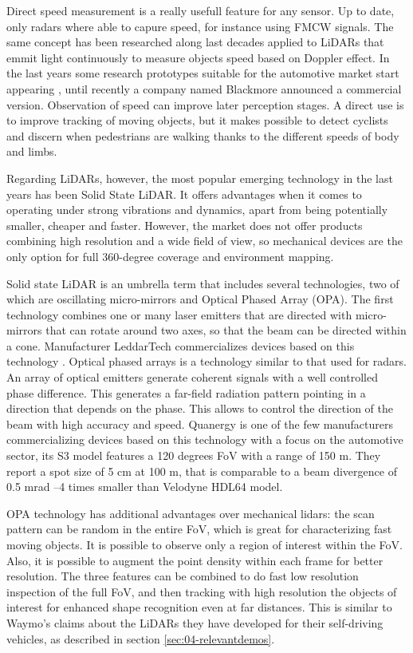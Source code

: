 Direct speed measurement is a really usefull feature for any sensor. Up to date,
only radars where able to capure speed, for instance using FMCW signals.
The same concept has been researched along last decades \cite{Nordin2004}
applied to LiDARs that emmit light continuously to measure objects speed based 
on Doppler effect. In the last years some research prototypes suitable for
the automotive market start appearing \cite{Poulton2016}, until recently
a company named Blackmore announced a commercial version. 
Observation of speed can improve later perception stages. A direct use is to
improve tracking of moving objects, but it makes possible to detect cyclists 
and discern when pedestrians are walking thanks to the different speeds of
body and limbs.

Regarding LiDARs, however, the most popular emerging technology in the last 
years has been Solid State LiDAR. It offers advantages when it comes
to operating under strong vibrations and dynamics, apart from being potentially
smaller, cheaper and faster. 
However, the market does not offer products combining high resolution and a 
wide field of view, so mechanical devices are the only option for full 
360-degree coverage and environment mapping.

Solid state LiDAR is an umbrella term that includes several technologies, two 
of which are oscillating micro-mirrors and Optical Phased Array (OPA).
The first technology combines one or many laser emitters that are directed
with micro-mirrors that can rotate around two axes, so that the beam 
can be directed within a cone. Manufacturer LeddarTech commercializes devices
based on this technology \cite{LeddarTech2016}.
Optical phased arrays \cite{McManamon1996} is a technology similar to that used 
for radars. An array of optical emitters generate coherent signals with a well
controlled phase difference. This generates a far-field radiation pattern 
pointing in a direction that depends on the phase. This allows to control the 
direction of the beam with high accuracy and speed. Quanergy \cite{Eldada2017} 
is one of the few manufacturers commercializing devices based on this technology
with a focus on the automotive sector, its S3 model features a 120 degrees FoV
with a range of 150 m. They report a spot size of 5 cm at 100 m, that is 
comparable to a beam divergence of 0.5 mrad --4 times smaller than Velodyne 
HDL64 model.

OPA technology has additional advantages over mechanical lidars: the scan 
pattern can be random in the entire FoV, which is great for characterizing fast 
moving objects. It is possible to observe only a region of interest within the 
FoV. Also, it is possible to augment the point density within each frame for 
better resolution. The three features can be combined to do fast low resolution 
inspection of the full FoV, and then tracking with high resolution the objects
of interest for enhanced shape recognition even at far distances.
This is similar to Waymo's claims about the LiDARs they have developed for their
self-driving vehicles, as described in section \ref{sec:04-relevantdemos}.

